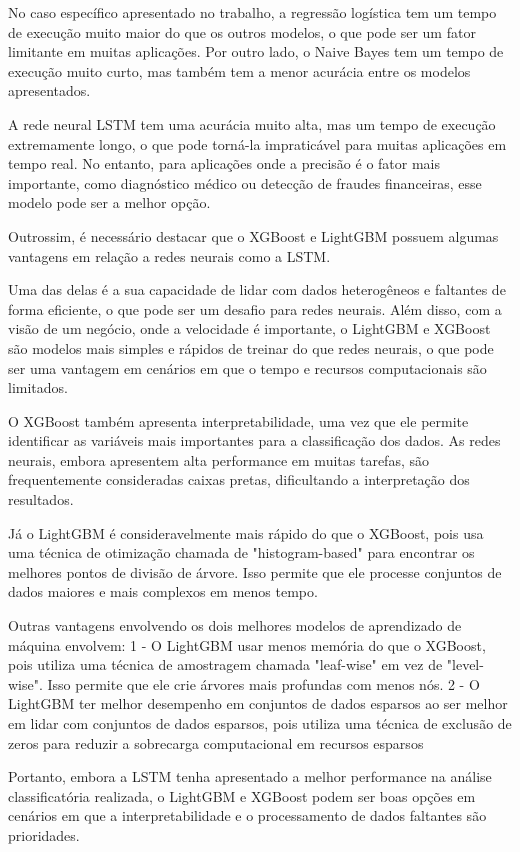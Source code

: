 No caso específico apresentado no trabalho, a regressão logística tem um tempo de execução muito maior do que os outros modelos, o que pode ser um fator limitante em muitas aplicações. Por outro lado, o Naive Bayes tem um tempo de execução muito curto, mas também tem a menor acurácia entre os modelos apresentados.

A rede neural LSTM tem uma acurácia muito alta, mas um tempo de execução extremamente longo, o que pode torná-la impraticável para muitas aplicações em tempo real. No entanto, para aplicações onde a precisão é o fator mais importante, como diagnóstico médico ou detecção de fraudes financeiras, esse modelo pode ser a melhor opção.

Outrossim, é necessário destacar que o XGBoost e LightGBM possuem algumas vantagens em relação a redes neurais como a LSTM.

Uma das delas é a sua capacidade de lidar com dados heterogêneos e faltantes de forma eficiente, o que pode ser um desafio para redes neurais. Além disso, com a visão de um negócio, onde a velocidade é importante, o LightGBM e XGBoost são modelos mais simples e rápidos de treinar do que redes neurais, o que pode ser uma vantagem em cenários em que o tempo e recursos computacionais são limitados.

O XGBoost também apresenta interpretabilidade, uma vez que ele permite identificar as variáveis mais importantes para a classificação dos dados. As redes neurais, embora apresentem alta performance em muitas tarefas, são frequentemente consideradas caixas pretas, dificultando a interpretação dos resultados.

Já o LightGBM é consideravelmente mais rápido do que o XGBoost, pois usa uma técnica de otimização chamada de "histogram-based" para encontrar os melhores pontos de divisão de árvore. Isso permite que ele processe conjuntos de dados maiores e mais complexos em menos tempo.

Outras vantagens envolvendo os dois melhores modelos de aprendizado de máquina envolvem: 1 - O LightGBM usar menos memória do que o XGBoost, pois utiliza uma técnica de amostragem chamada "leaf-wise" em vez de "level-wise". Isso permite que ele crie árvores mais profundas com menos nós. 2 - O LightGBM ter melhor desempenho em conjuntos de dados esparsos ao ser melhor em lidar com conjuntos de dados esparsos, pois utiliza uma técnica de exclusão de zeros para reduzir a sobrecarga computacional em recursos esparsos

Portanto, embora a LSTM tenha apresentado a melhor performance na análise classificatória realizada, o LightGBM e XGBoost podem ser boas opções em cenários em que a interpretabilidade e o processamento de dados faltantes são prioridades.


